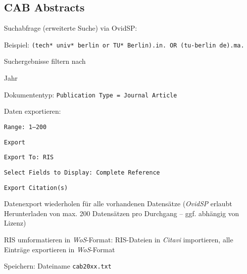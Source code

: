 \subsection*{CAB Abstracts}
\begin{compactitem}
\item Suchabfrage (erweiterte Suche) via OvidSP: 
	\begin{compactitem}
	\item Beispiel: \texttt{(tech* univ* berlin or TU* Berlin).in. OR (tu-berlin de).ma.}
	\end{compactitem}
\item Suchergebnisse filtern nach
	\begin{compactitem}
    \item Jahr
    \item Dokumententyp: \texttt{Publication Type = Journal Article}
    \end{compactitem}
\item Daten exportieren: 
	\begin{compactitem}
	\item \texttt{Range: 1--200}
    \item \texttt{Export}
    \item \texttt{Export To: RIS}
    \item \texttt{Select Fields to Display: Complete Reference}
    \item \texttt{Export Citation(s)}
	\end{compactitem}
\item Datenexport wiederholen für alle vorhandenen Datensätze (\textit{OvidSP} erlaubt Herunterladen von max. 200 Datensätzen pro Durchgang -- ggf. abhängig von Lizenz)
\item RIS umformatieren in \textit{WoS}-Format: RIS-Dateien in \textit{Citavi} importieren, alle Einträge exportieren in \textit{WoS}-Format
\item Speichern: Dateiname \texttt{cab20xx.txt}
\end{compactitem}

\pagebreak
